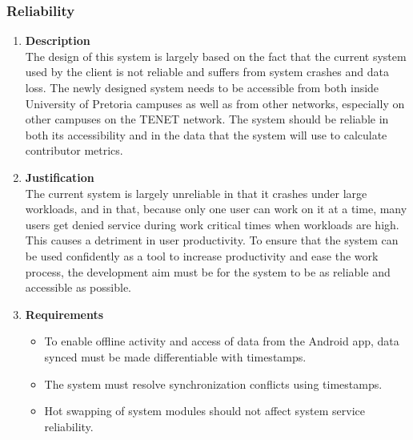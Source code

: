 \documentclass[a4paper,10pt]{article}
\begin{document}
\subsubsection{Reliability}
\begin{enumerate}
\item \textbf{Description} \\
The design of this system is largely based on the fact that the current system used by the client is not reliable and suffers from system crashes and data loss. The newly designed system needs to be accessible from both inside University of Pretoria campuses as well as from other networks, especially on other campuses on the TENET network. The system should be reliable in both its accessibility and in the data that the system will use to calculate contributor metrics. 
\item \textbf{Justification} \\ 
The current system is largely unreliable in that it crashes under large workloads, and in that, because only one user can work on it at a time, many users get denied service during work critical times when workloads are high. This causes a detriment in user productivity. To ensure that the system can be used confidently as a tool to increase productivity and ease the work process, the development aim must be for the system to be as reliable and accessible as possible.
\item \textbf{Requirements}
	\begin{itemize}
		\item To enable offline activity and access of data from the Android app, data synced must be made differentiable with timestamps.
		\item The system must resolve synchronization conflicts using timestamps.
		\item Hot swapping of system modules should not affect system service reliability.
	\end{itemize}
\end{enumerate}
\end{document}
